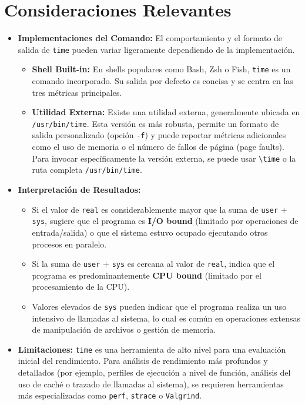 \documentclass{article}
\begin{document}
	\section{Consideraciones Relevantes}
	\begin{itemize}[leftmargin=*,noitemsep,topsep=0pt]
		\item \textbf{Implementaciones del Comando:} El comportamiento y el formato de salida de \texttt{time} pueden variar ligeramente dependiendo de la implementación.
		\begin{itemize}[leftmargin=*,noitemsep,topsep=0pt]
			\item \textbf{Shell Built-in:} En shells populares como Bash, Zsh o Fish, \texttt{time} es un comando incorporado. Su salida por defecto es concisa y se centra en las tres métricas principales.
			\item \textbf{Utilidad Externa:} Existe una utilidad externa, generalmente ubicada en \texttt{/usr/bin/time}. Esta versión es más robusta, permite un formato de salida personalizado (opción \texttt{-f}) y puede reportar métricas adicionales como el uso de memoria o el número de fallos de página (page faults). Para invocar específicamente la versión externa, se puede usar \texttt{\textbackslash{}time} o la ruta completa \texttt{/usr/bin/time}.
		\end{itemize}
		\item \textbf{Interpretación de Resultados:}
		\begin{itemize}[leftmargin=*,noitemsep,topsep=0pt]
			\item Si el valor de \texttt{real} es considerablemente mayor que la suma de \texttt{user} + \texttt{sys}, sugiere que el programa es \textbf{I/O bound} (limitado por operaciones de entrada/salida) o que el sistema estuvo ocupado ejecutando otros procesos en paralelo.
			\item Si la suma de \texttt{user} + \texttt{sys} es cercana al valor de \texttt{real}, indica que el programa es predominantemente \textbf{CPU bound} (limitado por el procesamiento de la CPU).
			\item Valores elevados de \texttt{sys} pueden indicar que el programa realiza un uso intensivo de llamadas al sistema, lo cual es común en operaciones extensas de manipulación de archivos o gestión de memoria.
		\end{itemize}
		\item \textbf{Limitaciones:} \texttt{time} es una herramienta de alto nivel para una evaluación inicial del rendimiento. Para análisis de rendimiento más profundos y detallados (por ejemplo, perfiles de ejecución a nivel de función, análisis del uso de caché o trazado de llamadas al sistema), se requieren herramientas más especializadas como \texttt{perf}, \texttt{strace} o \texttt{Valgrind}.
	\end{itemize}
	
\end{document}
